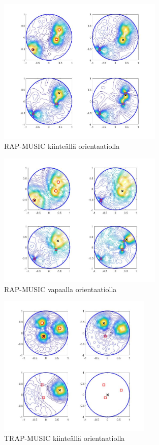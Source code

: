\clearpage

\begin{figure}[ht]
    \centering
    \includegraphics[width=0.7\textwidth]{RAPfixed.jpg}
    \caption{RAP-MUSIC kiinteällä orientaatiolla}
    \label{fig:RAPfix}
\end{figure}

\begin{figure}[h!]
    \centering
    \includegraphics[width=0.7\textwidth]{RAPfree.jpg}
    \caption{RAP-MUSIC vapaalla orientaatiolla}
    \label{fig:RAPfree}
\end{figure}

\clearpage
\begin{figure}[ht]
    \centering
    \includegraphics[width = 0.65\textwidth]{trap.jpg}
    \caption{TRAP-MUSIC kiinteällä orientaatiolla}
    \label{fig:TRAPfix}
\end{figure}

